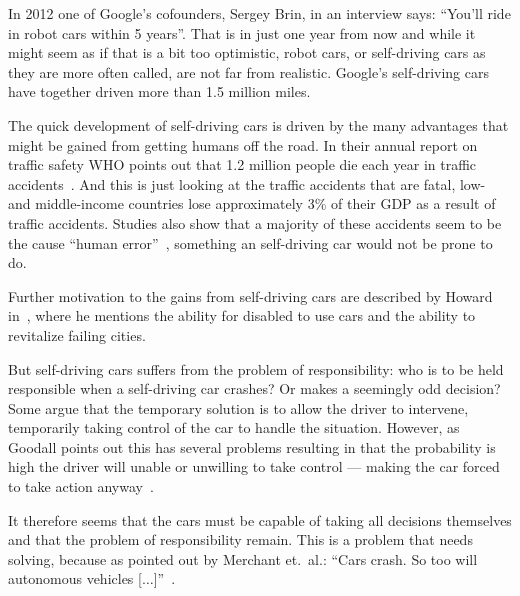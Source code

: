 In 2012 one of Google's cofounders, Sergey Brin, in an interview says: ``You'll
ride in robot cars within 5 years''. That is in just one year from now and while
it might seem as if that is a bit too optimistic, robot cars, or self-driving
cars as they are more often called, are not far from realistic. Google's
self-driving cars have together driven more than 1.5 million miles.

The quick development of self-driving cars is driven by the many advantages that
might be gained from getting humans off the road. In their annual report on
traffic safety WHO points out that 1.2 million people die each year in traffic
accidents~\cite{worldhealthorganization_2015_global_gsrors2sadoa}. And this is
just looking at the traffic accidents that are fatal, low- and middle-income
countries lose approximately 3\% of their GDP as a result of traffic accidents.
Studies also show that a majority of these accidents seem to be the cause
``human error''~\cite{relative_trfoudas}, something an self-driving car would
not be prone to do.

Further motivation to the gains from self-driving cars are described by Howard
in~\cite{howard_science_smbarotrtmiotdc}, where he mentions the ability for
disabled to use cars and the ability to revitalize failing cities.

But self-driving cars suffers from the problem of responsibility: who is to be
held responsible when a self-driving car crashes? Or makes a seemingly odd
decision? Some argue that the temporary solution is to allow the driver to
intervene, temporarily taking control of the car to handle the situation.
However, as Goodall points out this has several problems resulting in that the
probability is high the driver will unable or unwilling to take control ---
making the car forced to take action anyway~\cite{goodall_2014_machine_meaav}.

It therefore seems that the cars must be capable of taking all decisions
themselves and that the problem of responsibility remain. This is a problem that
needs solving, because as pointed out by Merchant et.\ al.:
``Cars crash. So too will autonomous vehicles
[$\ldots$]''~\cite{marchant_2012_coming_ccbavatlst}.

